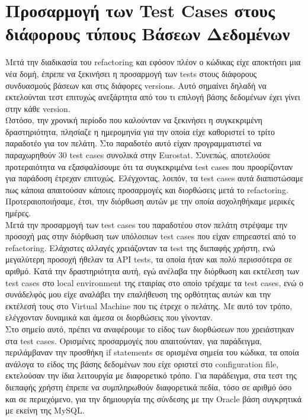 \section*{Προσαρμογή των Test Cases στους διάφορους τύπους Βάσεων Δεδομένων}
Μετά την διαδικασία του refactoring και εφόσον πλέον ο κώδικας είχε αποκτήσει μια νέα δομή, έπρεπε να ξεκινήσει η προσαρμογή των tests στους διάφορους συνδυασμούς βάσεων και στις διάφορες versions. Αυτό σημαίνει δηλαδή 
να εκτελούνται τεστ επιτυχώς ανεξάρτητα από του τι επιλογή βάσης δεδομένων έχει γίνει στην κάθε version. \\

Ωστόσο, την χρονική περίοδο που καλούνταν να ξεκινήσει η συγκεκριμένη δραστηριότητα, πλησίαζε η ημερομηνία για την οποία είχε καθοριστεί το τρίτο παραδοτέο για τον πελάτη. Στο παραδοτέο αυτό είχαν προγραμματιστεί 
να παραχωρηθούν 30 test cases συνολικά στην Eurostat. Συνεπώς, αποτελούσε προτεραιότητα να εξασφαλίσουμε ότι τα συγκεκριμένα test cases που προορίζονταν για παράδοση έτρεχαν επιτυχώς. Ελέγχοντας, λοιπόν, τα test cases 
αυτά διαπιστώσαμε πως κάποια απαιτούσαν κάποιες προσαρμογές και διορθώσεις μετά το refactoring. Προτεραιοποιήσαμε, έτσι, την διόρθωση αυτών με την οποία ασχοληθήκαμε μερικές ημέρες.\\

Μετά την προσαρμογή των test cases του παραδοτέου στον πελάτη στρέψαμε την προσοχή μας στην διόρθωση των υπόλοιπων test cases που είχαν επηρεαστεί από το refactoring. Ελάχιστες αλλαγές χρειάζονταν τα 
test της διεπαφής χρήστη, ενώ μεγαλύτερη προσοχή ήθελαν τα API tests, τα οποία ήταν και πολύ περισσότερα σε αριθμό. Κατά την δραστηριότητα αυτή, εγώ ανέλαβα την διόρθωση και εκτέλεση των test cases στο local 
environment της εταιρίας στο οποίο τρέχαμε τα test cases, ενώ ο συνάδελφός μου είχε αναλάβει την επαλήθευση της ορθότητας αυτών και την εκτέλεσή τους στο Virtual Machine που τις έτρεχε ο πελάτης. Με αυτό τον 
τρόπο, ελέγχονταν δυναμικά και άμεσα οι διορθώσεις που γίνονταν.\\

Στο σημείο αυτό, πρέπει να αναφέρουμε το είδος των διορθώσεων που χρειάστηκαν στα test cases. Ορισμένες προσαρμογές που απαιτούνταν, για παράδειγμα, περιλάμβαναν την προσθήκη if statements σε ορισμένα σημεία του 
κώδικα, τα οποία ανάλογα το είδος της βάσης δεδομένων που είχε οριστεί στο configuration file, εκτελούσαν την ίδια λειτουργία με διαφορετικό τρόπο. Για παράδειγμα, στα τεστ της διεπαφής χρήστη έπρεπε να συμπληρωθούν 
διαφορετικά πεδία, τόσο σε αριθμό όσο και σε περιεχόμενο, για την δημιουργία της σύνδεσης με την Oracle βάση συγκρητικά με εκείνη της MySQL.

